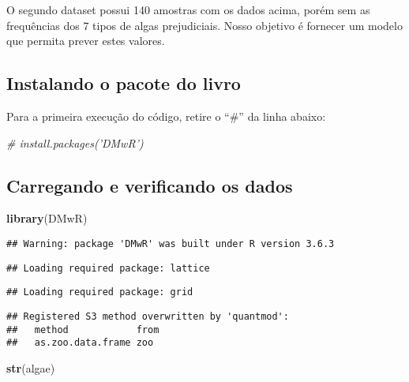 \documentclass[
]{article}
\newenvironment{Shaded}{\begin{snugshade}}{\end{snugshade}}
\newcommand{\CommentTok}[1]{\textcolor[rgb]{0.56,0.35,0.01}{\textit{#1}}}
\newcommand{\KeywordTok}[1]{\textcolor[rgb]{0.13,0.29,0.53}{\textbf{#1}}}
\newcommand{\NormalTok}[1]{#1}
\begin{document}
O segundo dataset possui 140 amostras com os dados acima, porém sem as
frequências dos 7 tipos de algas prejudiciais. Nosso objetivo é fornecer
um modelo que permita prever estes valores.

\hypertarget{instalando-o-pacote-do-livro}{%
\subsection{Instalando o pacote do
livro}\label{instalando-o-pacote-do-livro}}

Para a primeira execução do código, retire o ``\#'' da linha abaixo:

\begin{Shaded}
\begin{Highlighting}[]
\CommentTok{# install.packages('DMwR')}
\end{Highlighting}
\end{Shaded}

\hypertarget{carregando-e-verificando-os-dados}{%
\subsection{Carregando e verificando os
dados}\label{carregando-e-verificando-os-dados}}

\begin{Shaded}
\begin{Highlighting}[]
\KeywordTok{library}\NormalTok{(DMwR)}
\end{Highlighting}
\end{Shaded}

\begin{verbatim}
## Warning: package 'DMwR' was built under R version 3.6.3
\end{verbatim}

\begin{verbatim}
## Loading required package: lattice
\end{verbatim}

\begin{verbatim}
## Loading required package: grid
\end{verbatim}

\begin{verbatim}
## Registered S3 method overwritten by 'quantmod':
##   method            from
##   as.zoo.data.frame zoo
\end{verbatim}

\begin{Shaded}
\begin{Highlighting}[]
\KeywordTok{str}\NormalTok{(algae)}
\end{Highlighting}
\end{Shaded}
\end{document}
